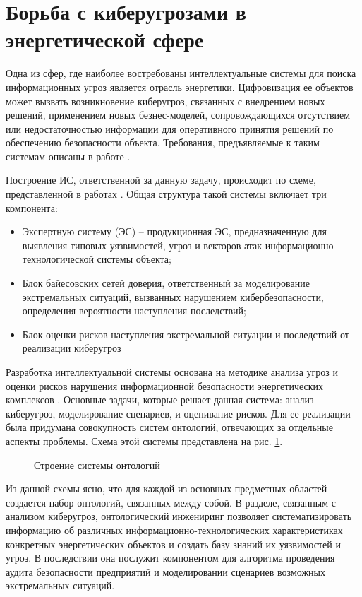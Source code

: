 \section{Борьба с киберугрозами в энергетической сфере}
Одна из сфер, где наиболее востребованы интеллектуальные системы для поиска информационных угроз
является отрасль энергетики. Цифровизация ее объектов может вызвать возникновение киберугроз,
связанных с внедрением новых решений, применением новых безнес-моделей, сопровождающихся отсутствием
или недостаточностью информации для оперативного принятия решений по обеспечению безопасности объекта.
Требования, предъявляемые к таким системам описаны в работе \cite{reqs}.

Построение ИС, ответственной за данную задачу, происходит по схеме, представленной
в работах \cite{scheme, ontoling}.
Общая структура такой системы включает три компонента:
\begin{itemize}
\item
Экспертную систему (ЭС) -- продукционная ЭС, предназначенную для выявления типовых уязвимостей,
угроз и векторов атак информационно-технологической системы объекта;
\item
Блок байесовских сетей доверия, ответственный за моделирование экстремальных ситуаций, вызванных нарушением
кибербезопасности, определения вероятности наступления последствий;
\item
Блок оценки рисков наступления экстремальной ситуации и последствий от реализации киберугроз
\end{itemize}

Разработка интеллектуальной системы основана на методике анализа угроз и оценки рисков нарушения
информационной безопасности энергетических комплексов \cite{methods}. Основные задачи, которые решает
данная система: анализ киберугроз, моделирование сценариев, и оценивание рисков.
Для ее реализации была придумана совокупность систем онтологий, отвечающих за отдельные аспекты проблемы.
Схема этой системы представлена на рис. \ref{dio}.

\begin{figure}[h]
    \caption{Строение системы онтологий}
    \label{dio}
\end{figure}

Из данной схемы ясно, что для каждой из основных предметных областей создается набор онтологий, связанных
между собой. В разделе, связанным с анализом киберугроз, онтологический инжениринг позволяет систематизировать
информацию об различных информационно-технологических характеристиках конкретных энергетических объектов
и создать базу знаний их уязвимостей и угроз. В последствии она послужит компонентом для алгоритма проведения
аудита безопасности предприятий и моделировании сценариев возможных экстремальных ситуаций.

